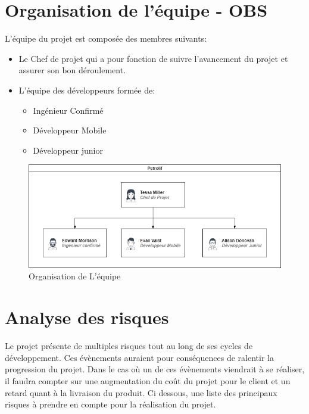 \documentclass[a4paper]{article}
\begin{document}
	\section{Organisation de l'équipe - OBS}
	L'équipe du projet est composée des membres suivants: 
	\begin{itemize}
	    \item Le Chef de projet qui a pour fonction de suivre l'avancement du projet et assurer son bon déroulement.
	    \item L'équipe des développeurs formée de:

	    \begin{itemize}
	        \item Ingénieur Confirmé
	        \item Développeur Mobile
	        \item Développeur junior
	    \end{itemize}
	\end{itemize}
	\begin{figure}[h]
	    \centering
	    \includegraphics[scale=0.5]{Images/org.png}
	    \caption{Organisation de L'équipe}
	    \label{fig:org}
	\end{figure}
	
	\newpage
	\section{Analyse des risques}

Le projet présente de multiples risques tout au long de ses cycles de développement. Ces évènements auraient pour conséquences de ralentir la progression du projet. Dans le cas où un de ces évènements viendrait à se réaliser, il faudra compter sur une augmentation du coût du projet pour le client et un retard quant à la livraison du produit. Ci dessous, une liste des principaux risques à prendre en compte pour la réalisation du projet.
\end{document}
